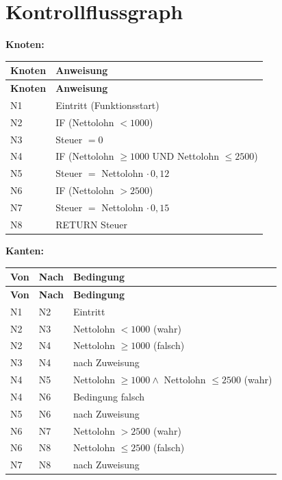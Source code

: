 \documentclass[
	fontsize=12pt,          %
	paper=a4,               %
	numbers=noenddot,       %
	listof=totoc,           %
	listof=entryprefix,     %
	listof=nochaptergap,    %
	bibliography=totoc,     %
	parskip=half,           %
	openany                 %
]{scrbook}
\begin{document}
\section*{Kontrollflussgraph}

\textbf{Knoten:}

\begin{longtable}{| p{1.2cm} | p{10.5cm} |}
	\hline
	\textbf{Knoten} & \textbf{Anweisung} \\ \hline
	\endfirsthead
	\hline
	\textbf{Knoten} & \textbf{Anweisung} \\ \hline
	\endhead
	\hline
	\endfoot
	N1 & Eintritt (Funktionsstart) \\ \hline
	N2 & IF (Nettolohn $< 1000$) \\ \hline
	N3 & Steuer $= 0$ \\ \hline
	N4 & IF (Nettolohn $\geq 1000$ UND Nettolohn $\leq 2500$) \\ \hline
	N5 & Steuer $=$ Nettolohn $\cdot\, 0{,}12$ \\ \hline
	N6 & IF (Nettolohn $> 2500$) \\ \hline
	N7 & Steuer $=$ Nettolohn $\cdot\, 0{,}15$ \\ \hline
	N8 & RETURN Steuer \\ \hline
\end{longtable}

\textbf{Kanten:}

\begin{longtable}{| p{1.5cm} | p{1.5cm} | p{8.5cm} |}
	\hline
	\textbf{Von} & \textbf{Nach} & \textbf{Bedingung} \\ \hline
	\endfirsthead
	\hline
	\textbf{Von} & \textbf{Nach} & \textbf{Bedingung} \\ \hline
	\endhead
	\hline
	\endfoot
	N1 & N2 & Eintritt \\ \hline
	N2 & N3 & Nettolohn $< 1000$ (wahr) \\ \hline
	N2 & N4 & Nettolohn $\geq 1000$ (falsch) \\ \hline
	N3 & N4 & nach Zuweisung \\ \hline
	N4 & N5 & Nettolohn $\geq 1000 \wedge$ Nettolohn $\leq 2500$ (wahr) \\ \hline
	N4 & N6 & Bedingung falsch \\ \hline
	N5 & N6 & nach Zuweisung \\ \hline
	N6 & N7 & Nettolohn $> 2500$ (wahr) \\ \hline
	N6 & N8 & Nettolohn $\leq 2500$ (falsch) \\ \hline
	N7 & N8 & nach Zuweisung \\ \hline
\end{longtable}
\end{document}
